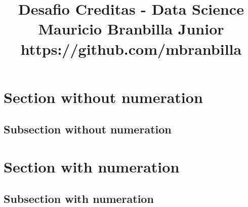 \documentclass[10pt,a4paper,twocolumn]{article} %
\title{%
	\textbf{Desafio Creditas - Data Science} \\[12pt]
	\large Mauricio Branbilla Junior \\
	\small https://github.com/mbranbilla \\
	}
\date{}
\begin{document}
	\maketitle
	
	\section*{Section without numeration}
		\subsection*{Subsection without numeration}
		
	\section{Section with numeration}
		\subsection{Subsection with numeration}
		
\end{document}

